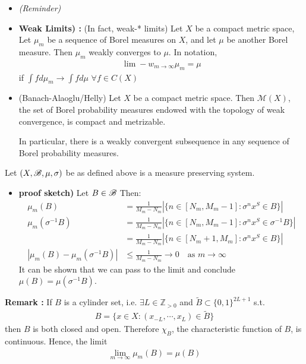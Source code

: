 \documentclass[10pt,a4paper]{report}
\begin{document}
\begin{itemize}
\item[ ] \textsl{(Reminder)}

\item \textbf{Weak Limits) : }(In fact, weak-* limits) Let $X$ be a compact metric space, Let $\mu_m$ be a sequence of Borel measures on $X$, and let $\mu$ be another Borel measure. Then $\mu_m$ weakly converges to $\mu$. In notation,
\begin{align*}
\lim-w_{m\rightarrow \infty} \mu_m = \mu
\end{align*}
if $\int f d\mu_m \rightarrow \int f d\mu$ $\forall f\in C(X)$

\item \thm (Banach-Alaoglu/Helly) Let $X$ be a compact metric space. Then $\mathscr{M}(X)$, the set of Borel probability measures endowed with the topology of weak convergence, is compact and metrizable.

In particular, there is a weakly convergent subsequence in any sequence of Borel probability measures.
\end{itemize}
\s

\lem Let $(X,\mathscr{B}, \mu, \sigma)$ be as defined above is a measure preserving system.
\begin{itemize}
\item[ ] \textbf{proof sketch)} Let $B\in \mathscr{B}$ Then:
\begin{align*}
\mu_m(B) &= \frac{1}{M_m-N_m} |\{ n \in [N_m, M_m-1] : \sigma^n x^S \in B \}  | \\
\mu_m(\sigma^{-1}B) &= \frac{1}{M_m-N_m} | \{n\in [N_m, M_m -1]:\sigma^n x^S \in \sigma^{-1} B \} | \\
&= \frac{1}{M_m-N_m} | \{n\in [N_m +1, M_m]:\sigma^n x^S \in B \} | \\
|\mu_m(B) - \mu_m(\sigma^{-1}B)| &\leq \frac{1}{M_m-N_m} \rightarrow 0 \quad \text{as } m\rightarrow \infty
\end{align*} 
It can be shown that we can pass to the limit and conclude $\mu (B) = \mu(\sigma^{-1}B)$.
\end{itemize}
\s

\bull \textbf{Remark :} If $B$ is a cylinder set, i.e. $\exists L \in \mathbb{Z}_{>0}$ and $\tilde{B} \subset \{0,1\}^{2L+1}$ s.t.
\begin{align*}
B = \{ x\in X : (x_{-L},\cdots,x_L) \in \tilde{B} \}
\end{align*}
then $B$ is both closed and open. Therefore $\chi_B$, the characteristic function of $B$, is continuous. Hence, the limit
\begin{align*}
\lim_{m\rightarrow \infty} \mu_m(B) = \mu(B)
\end{align*}
\s
\end{document}

